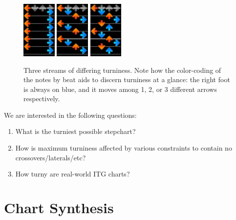 \documentclass[10pt]{sigplanconf}
\begin{document}
\begin{figure}[t]
	\begin{center}
	\includegraphics[width=0.15\textwidth]{tower.png}
	\includegraphics[width=0.15\textwidth]{staircase.png}
	\includegraphics[width=0.15\textwidth]{twistystair.png}
	\end{center}
	\caption{Three streams of differing turniness.
	Note how the color-coding of the notes by beat aids to discern turniness at a glance: the right foot is always on blue, and it moves among 1, 2, or 3 different arrows respectively.}
	\label{fig:stream}
\end{figure}

We are interested in the following questions:
\begin{enumerate}
	\item What is the turniest possible stepchart?
	\item How is maximum turniness affected by various constraints to contain no crossovers/laterals/etc?
	\item How turny are real-world ITG charts?
\end{enumerate}

\section{Chart Synthesis}
\end{document}
